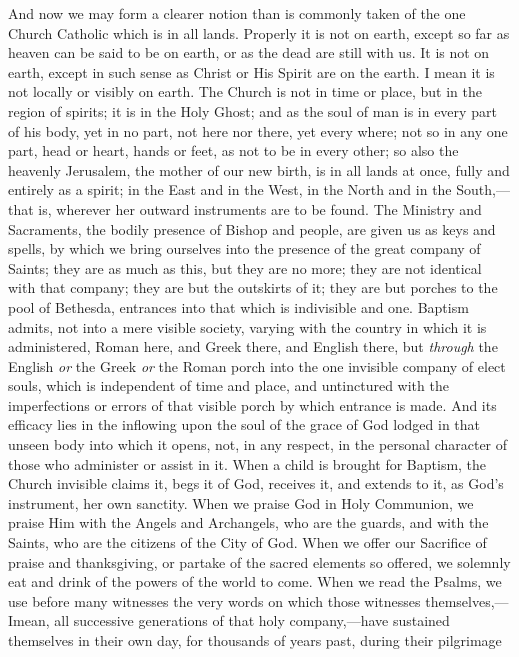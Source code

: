 And now we may form a clearer notion than is commonly taken of the
one Church Catholic which is in all lands. Properly it is not on
earth, except so far as heaven can be said to be on earth, or as the
dead are still with us. It is not on earth, except in such sense as
Christ or His Spirit are on the earth. I mean it is not locally or
visibly on earth. The Church is not in time or place, but in the
region of spirits; it is in the Holy Ghost; and as the soul of man is
in every part of his body, yet in no part, not here nor there, yet
every where; not so in any one part, head or heart, hands or feet, as
not to be in every other; so also the heavenly Jerusalem, the mother
of our new birth, is in all lands at once, fully and entirely as a
spirit; in the East and in the West, in the North and in the South,—that
is, wherever her outward instruments are to be found. The Ministry and
Sacraments, the bodily presence of Bishop and people, are given us as
keys and spells, by which we bring ourselves into the presence of the
great company of Saints; they are as much as this, but they are no
more; they are not identical with that company; they are but the
outskirts of it; they are but porches to the pool of Bethesda,
entrances into that which is indivisible and one. Baptism admits, not
into a mere visible society, varying with the country in which it is
administered, Roman here, and Greek there, and English there, but \emph{through}
the English \emph{or} the Greek \emph{or} the Roman porch into the one
invisible company of elect souls, which is independent of time and
place, and untinctured with the imperfections or errors of that
visible porch by which entrance is made. And its efficacy lies in the
inflowing upon the soul of the grace of God lodged in that unseen body
into which it opens, not, in any respect, in the personal character of
those who administer or assist in it. When a child is brought for
Baptism, the Church invisible claims it, begs it of God, receives it,
and extends to it, as God's instrument, her own sanctity. When we
praise God in Holy Communion, we praise Him with the Angels and
Archangels, who are the guards, and with the Saints, who are the
citizens of the City of God. When we offer our Sacrifice of praise and
thanksgiving, or partake of the sacred elements so offered, we
solemnly eat and drink of the powers of the world to come. When we
read the Psalms, we use before many witnesses the very words on which
those witnesses themselves,—I\emph{}mean, all successive
generations of that holy company,—have sustained themselves in their
own day, for thousands of years past, during their pilgrimage
